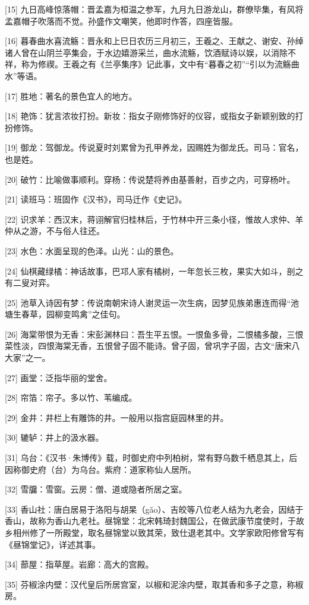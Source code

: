 \documentclass[12pt,UTF8]{ctexbook}
\begin{document}
[15] 九日高峰惊落帽：晋孟嘉为桓温之参军，九月九日游龙山，群僚毕集，有风将孟嘉帽子吹落而不觉。孙盛作文嘲笑，他即时作答，四座皆服。

[16] 暮春曲水喜流觞：晋永和上巳日农历三月初三，王羲之、王献之、谢安、孙绰诸人曾在山阴兰亭集会，于水边嬉游采兰，曲水流觞，饮酒赋诗以娱，以消除不祥，称为修禊。王羲之有《兰亭集序》记此事，文中有“暮春之初”“引以为流觞曲水”等语。

[17] 胜地：著名的景色宜人的地方。

[18] 艳饰：犹言浓妆打扮。新妆：指女子刚修饰好的仪容，或指女子新颖别致的打扮修饰。

[19] 御龙：驾御龙。传说夏时刘累曾为孔甲养龙，因赐姓为御龙氏。司马：官名，也是姓。

[20] 破竹：比喻做事顺利。穿杨：传说楚将养由基善射，百步之内，可穿杨叶。

[21] 读班马：班固作《汉书》，司马迁作《史记》。

[22] 识求羊：西汉末，蒋诩解官归桂林后，于竹林中开三条小径，惟故人求仲、羊仲从之游，不与俗人往还。

[23] 水色：水面呈现的色泽。山光：山的景色。

[24] 仙棋藏绿橘：神话故事，巴邛人家有橘树，一年忽长三枚，果实大如斗，剖之有二叟对弈。

[25] 池草入诗因有梦：传说南朝宋诗人谢灵运一次生病，因梦见族弟惠连而得“池塘生春草，园柳变鸣禽”之佳句。

[26] 海棠带恨为无香：宋彭渊林曰：吾生平五恨。一恨鱼多骨，二恨橘多酸，三恨菜性淡，四恨海棠无香，五恨曾子固不能诗。曾子固，曾巩字子固，古文“唐宋八大家”之一。

[27] 画堂：泛指华丽的堂舍。

[28] 帘箔：帘子。多以竹、苇编成。

[29] 金井：井栏上有雕饰的井。一般用以指宫庭园林里的井。

[30] 辘轳：井上的汲水器。

[31] 乌台：《汉书·朱博传》载，时御史府中列柏树，常有野乌数千栖息其上，后因称御史府（台）为乌台。紫府：道家称仙人居所。

[32] 雪牖：雪窗。云房：僧、道或隐者所居之室。

[33] 香山社：唐白居易于洛阳与胡杲（gǎo）、吉皎等八位老人结为九老会，因结于香山，故称为香山九老社。昼锦堂：北宋韩琦封魏国公，在做武康节度使时，于故乡相州修了一所殿堂，取名昼锦堂以致其荣，致仕退老其中。文学家欧阳修曾写有《昼锦堂记》，详述其事。

[34] 蔀屋：指草屋。岩廊：高大的宫殿。

[35] 芬椒涂内壁：汉代皇后所居宫室，以椒和泥涂内壁，取其香和多子之意，称椒房。
\end{document}

